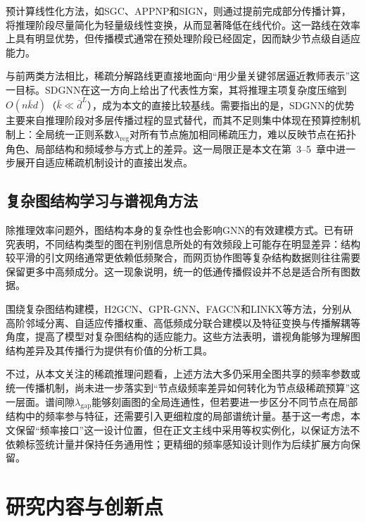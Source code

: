 预计算线性化方法，如SGC\cite{Wu2019SGC}\label{idx:name:sgc}、APPNP\cite{Gasteiger2019APPNP}\label{idx:name:appnp}和SIGN\cite{Frasca2020SIGN}，则通过提前完成部分传播计算，将推理阶段尽量简化为轻量级线性变换，从而显著降低在线代价。这一路线在效率上具有明显优势，但传播模式通常在预处理阶段已经固定，因而缺少节点级自适应能力。

与前两类方法相比，稀疏分解路线更直接地面向“用少量关键邻居逼近教师表示”这一目标。SDGNN\cite{Hu2024SDGNN}在这一方向上给出了代表性方案，其将推理主项复杂度压缩到$O(n\bar{k}d)$（$\bar{k}\ll\bar{d}^{L}$），成为本文的直接比较基线。需要指出的是，SDGNN的优势主要来自推理阶段对多层传播过程的显式替代，而其不足则集中体现在预算控制机制上：全局统一正则系数$\lambda_{\mathrm{reg}}$对所有节点施加相同稀疏压力，难以反映节点在拓扑角色、局部结构和频域参与方式上的差异。这一局限正是本文在第~3--5~章中进一步展开自适应稀疏机制设计的直接出发点。

\subsection{复杂图结构学习与谱视角方法}
\label{subsec:ch1-heterophily}

除推理效率问题外，图结构本身的复杂性也会影响GNN的有效建模方式。已有研究表明，不同结构类型的图在判别信息所处的有效频段上可能存在明显差异：结构较平滑的引文网络通常更依赖低频聚合，而网页协作图等复杂结构数据则往往需要保留更多中高频成分\cite{Pei2020GeomGCN}。这一现象说明，统一的低通传播假设并不总是适合所有图数据。

围绕复杂图结构建模，H2GCN\cite{Zhu2020H2GCN}\label{idx:name:h2gcn}、GPR-GNN\cite{Chien2021GPRGNN}\label{idx:name:gprgnn}、FAGCN\cite{Bo2021FAGCN}\label{idx:name:fagcn}和LINKX\cite{Lim2021LINKX}\label{idx:name:linkx}等方法，分别从高阶邻域分离、自适应传播权重、高低频成分联合建模以及特征变换与传播解耦等角度，提高了模型对复杂图结构的适应能力。这些方法表明，谱视角能够为理解图结构差异及其传播行为提供有价值的分析工具。

不过，从本文关注的稀疏推理问题看，上述方法大多仍采用全图共享的频率参数或统一传播机制，尚未进一步落实到“节点级频率差异如何转化为节点级稀疏预算”这一层面。谱间隙$\lambda_{\text{gap}}$\label{idx:theme:specgap}能够刻画图的全局连通性，但若要进一步区分不同节点在局部结构中的频率参与特征，还需要引入更细粒度的局部谱统计量。基于这一考虑，本文保留“频率接口”这一设计位置，但在正文主线中采用等权实例化，以保证方法不依赖标签统计量并保持任务通用性；更精细的频率感知设计则作为后续扩展方向保留。

\section{研究内容与创新点}
\label{sec:ch1-contribution}

